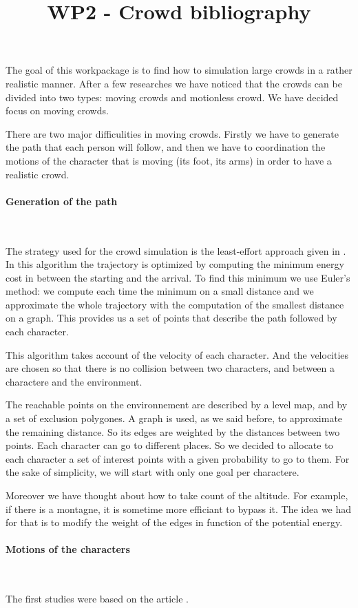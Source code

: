 \documentclass[a4paper,11pt]{article}
\theoremstyle{definition}
\theoremstyle{definition}
\theoremstyle{remark}
\theoremstyle{plain}
\theoremstyle{lemma}
\theoremstyle{corollary}
\theoremstyle{definition}
\begin{document}
  

\title{WP2 - Crowd bibliography}
\author{}
\date{}


The goal of this workpackage is to find how to simulation large crowds in a rather realistic manner. After a few researches we have noticed that the crowds can be divided into two types: moving crowds and motionless crowd. We have decided focus on moving crowds. 

There are two major difficulities in moving crowds. Firstly we have to generate the path that each person will follow, and then we have to coordination the motions of the character that is moving (its foot, its arms) in order to have a realistic crowd.

\paragraph{Generation of the path}~

The strategy used for the crowd simulation is the least-effort approach given in .%
 In this algorithm the trajectory is optimized by computing the minimum energy cost in between the starting and the arrival. To find this minimum we use Euler's method: we compute each time the minimum on a small distance and we approximate the whole trajectory with the computation of the smallest distance on a graph. This provides us a set of points that describe the path followed by each character.

This algorithm takes account of the velocity of each character. And the velocities are chosen so that there is no collision between two characters, and between a charactere and the environment.

The reachable points on the environnement are described by a level map, and by a set of exclusion polygones. A graph is used, as we said before, to approximate the remaining distance. So its edges are weighted by the distances between two points. Each character can go to different places. So we decided to allocate to each character a set of interest points with a given probability to go to them. For the sake of simplicity, we will start with only one goal per charactere.

Moreover we have thought about how to take count of the altitude. For example, if there is a montagne, it is sometime more efficiant to bypass it. The idea we had for that is to modify the weight of the edges in function of the potential energy. 

\paragraph{Motions of the characters}~

The first studies were based on the article .%
\end{document}
